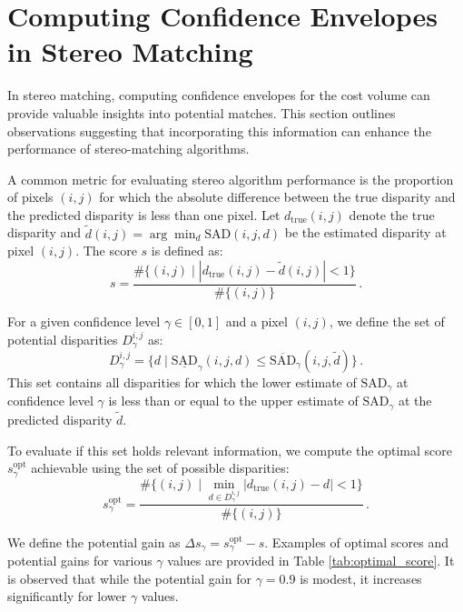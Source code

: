 \documentclass{article}
\begin{document}
\section{Computing Confidence Envelopes in Stereo Matching}

In stereo matching, computing confidence envelopes for the cost volume can provide valuable insights into potential matches. This section outlines observations suggesting that incorporating this information can enhance the performance of stereo-matching algorithms.

A common metric for evaluating stereo algorithm performance is the proportion of pixels $(i, j)$ for which the absolute difference between the true disparity and the predicted disparity is less than one pixel. Let $d_{\mathrm{true}}(i, j)$ denote the true disparity and $\tilde{d}(i, j) = \arg \min_d \mathrm{SAD}(i, j, d)$ be the estimated disparity at pixel $(i, j)$. The score \( s \) is defined as:
\begin{equation}
    s = \frac{\#\{(i, j) \mid |d_{\mathrm{true}}(i, j) - \tilde{d}(i, j)| < 1\}}{\#\{(i, j)\}}\,.
\end{equation}

For a given confidence level $\gamma \in [0, 1]$ and a pixel $(i, j)$, we define the set of potential disparities $D_\gamma^{i, j}$ as:
\begin{equation}
    D_\gamma^{i, j} = \{d \mid \underline{\mathrm{SAD}}_\gamma(i, j, d) \leq \overline{\mathrm{SAD}}_\gamma(i, j, \tilde{d})\}\,.
\end{equation}
This set contains all disparities for which the lower estimate of $\mathrm{SAD}_\gamma$ at confidence level $\gamma$ is less than or equal to the upper estimate of $\mathrm{SAD}_\gamma$ at the predicted disparity $\tilde{d}$.

To evaluate if this set holds relevant information, we compute the optimal score \( s_\gamma^{\text{opt}} \) achievable using the set of possible disparities:
\begin{equation}
    s_\gamma^{\text{opt}} = \frac{\#\{(i, j) \mid \min_{d \in D_\gamma^{i, j}} |d_{\mathrm{true}}(i, j) - d| < 1\}}{\#\{(i, j)\}}\,.
\end{equation}

We define the potential gain as \( \Delta s_\gamma = s_\gamma^{\text{opt}} - s \). Examples of optimal scores and potential gains for various $\gamma$ values are provided in Table \ref{tab:optimal_score}. It is observed that while the potential gain for $\gamma = 0.9$ is modest, it increases significantly for lower $\gamma$ values.
\end{document}
